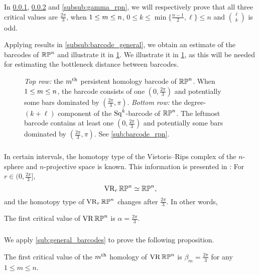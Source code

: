 In \cref{subsub:rpn homotopy type}, \cref{subsub:beta_m_rpn} and \cref{subsub:gamma_rpn}, we will respectively prove that all three critical values are $\frac{2\pi}{3}$, when $1 \leq m \leq n$, $0 \leq k \leq \min\{\frac{n-1}{2}, \ell\} \leq n$ and $\binom{\ell}{k}$ is odd.

Applying results in \cref{subsub:barcode_general}, we obtain an estimate of the barcodes of $\mathbb{RP}^n$ and illustrate it in \cref{fig:sq barcodes}.
We illustrate it in \cref{fig:sq barcodes}, as this will be needed for estimating the bottleneck distance between barcodes.

\begin{figure}
	\centering
	
	\caption{\emph{Top row:} the $m^{\mathrm{th}}$ persistent homology barcode of $\mathbb{RP}^n$.
		When $1\leq m \leq n$, the barcode consists of one $(0,\frac{2\pi}{3})$ and potentially some bars dominated by $(\frac{2\pi}{3}, \pi)$.
		\emph{Bottom row:} the degree-$(k+\ell)$ component of the $\operatorname{Sq}^k$-barcode of $\mathbb{RP}^n$.
		The leftmost barcode contains at least one $(0,\frac{2\pi}{3})$ and potentially some bars dominated by $(\frac{2\pi}{3}, \pi)$.
		See \cref{sub:barcode_rpn}.
	}
	\label{fig:sq barcodes}
\end{figure}

\subsubsection{}
\label{subsub:rpn homotopy type}

In certain intervals, the homotopy type of the Vietoris--Rips complex of the $n$-sphere and $n$-projective space is known.
This information is presented in \cite[Thm.~4.5]{adams2022metric}:
For $r \in (0,\frac{2\pi}{3} ]$,
\[
\operatorname{VR}_r\mathbb{RP}^n \simeq \mathbb{RP}^n,
\]
and the homotopy type of $\operatorname{VR}_r\mathbb{RP}^n$ changes after $\tfrac{2\pi}{3}$.
In other words,

\medskip\proposition
The first critical value of \(\operatorname{VR}\mathbb{RP}^n\) is \(\alpha = \frac{2\pi}{3}\).

\subsubsection{}
\label{subsub:beta_m_rpn}

We apply \cref{sub:general_barcodes} to prove the following proposition.

\medskip\proposition
The first critical value of the $m^{\mathrm{th}}$ homology of $\operatorname{VR}\mathbb{RP}^n$ is $\beta_m=\frac{2\pi}{3}$ for any $1\leq m\leq n$.

